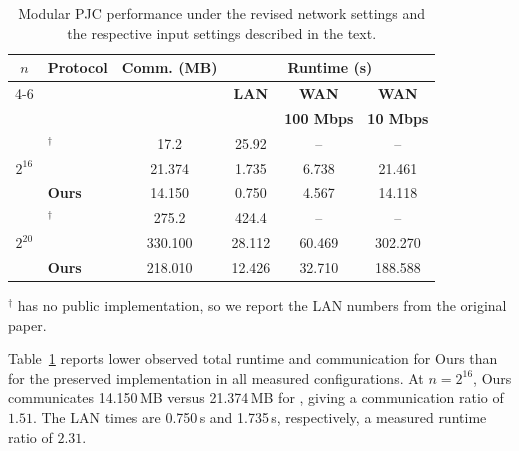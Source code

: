 \begin{table}[!htbp]
\centering
\caption{Modular PJC performance under the revised network settings and the respective input settings described in the text.}
\label{tab:pjc-comparison}

\setlength{\tabcolsep}{2.2pt}
\renewcommand{\arraystretch}{1.05}
\footnotesize

\begin{tabular}{c l c c c c}
\toprule

\multirow{2}{*}{$n$}
&
\multirow{2}{*}{\textbf{Protocol}}
&
\multirow{2}{*}{\textbf{Comm. (MB)}}
&
\multicolumn{3}{c}{\textbf{Runtime (s)}}
\\

\cmidrule(lr){4-6}

&
&
&
\textbf{LAN}
&
\textbf{WAN}
&
\textbf{WAN}
\\[-2pt]

&
&
&
&
\textbf{100 Mbps}
&
\textbf{10 Mbps}
\\

\midrule

\multirow[t]{3}{*}{$2^{16}$}
& \cite{CHI+23}$^\dagger$& 17.2 & 25.92 & -- & -- \\
& \cite{KLS26} & 21.374 & 1.735 & 6.738 & 21.461 \\
\cmidrule(lr){2-6}%
& \textbf{Ours} & 14.150 & 0.750 & 4.567 & 14.118 \\

\midrule

\multirow[t]{3}{*}{$2^{20}$}
& \cite{CHI+23}$^\dagger$& 275.2 & 424.4 & -- & -- \\
& \cite{KLS26} & 330.100 & 28.112 & 60.469 & 302.270 \\
\cmidrule(lr){2-6}
& \textbf{Ours} & 218.010 & 12.426 & 32.710 & 188.588 \\

\bottomrule
\end{tabular}

\vspace{2pt}
\begin{minipage}{0.95\linewidth}
\footnotesize
$^\dagger$ \cite{CHI+23} has no public implementation, so we report the LAN numbers from the original paper.
\end{minipage}

\end{table}

Table~\ref{tab:pjc-comparison} reports lower observed total runtime
and communication for Ours than for the preserved \cite{KLS26}
implementation in all measured configurations. At $n=2^{16}$, Ours
communicates 14.150\,MB versus 21.374\,MB for \cite{KLS26}, giving a
communication ratio of $1.51$. The LAN times are 0.750\,s and
1.735\,s, respectively, a measured runtime ratio of $2.31$.

